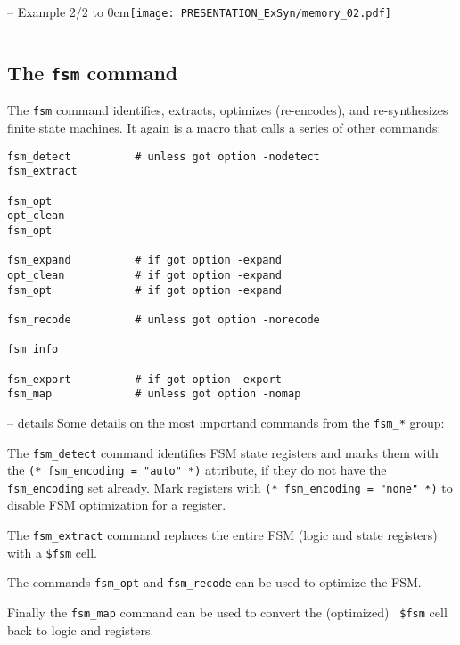 \begin{frame}[t, fragile]{\subsecname{} -- Example 2/2}
\vbox to 0cm{\hfill\texttt{[image: PRESENTATION\_ExSyn/memory\_02.pdf]}\vss}
\vskip-1cm
\begin{columns}
\column[t]{5cm}

\column[t]{5cm}

\end{columns}
\end{frame}


\subsection{The {\tt fsm} command}

\begin{frame}[fragile]{\subsecname{}}
The {\tt fsm} command identifies, extracts, optimizes (re-encodes), and
re-synthesizes finite state machines. It again is a macro that calls
a series of other commands:

\begin{lstlisting}[xleftmargin=0.5cm, basicstyle=\ttfamily\fontsize{8pt}{10pt}\selectfont, language=ys]
fsm_detect          # unless got option -nodetect
fsm_extract

fsm_opt
opt_clean
fsm_opt

fsm_expand          # if got option -expand
opt_clean           # if got option -expand
fsm_opt             # if got option -expand

fsm_recode          # unless got option -norecode

fsm_info

fsm_export          # if got option -export
fsm_map             # unless got option -nomap
\end{lstlisting}
\end{frame}

\begin{frame}{\subsecname{} -- details}
Some details on the most importand commands from the {\tt fsm\_*} group:

\bigskip
The {\tt fsm\_detect} command identifies FSM state registers and marks them
with the {\tt (* fsm\_encoding = "auto" *)} attribute, if they do not have the
{\tt fsm\_encoding} set already. Mark registers with {\tt (* fsm\_encoding =
"none" *)} to disable FSM optimization for a register.

\bigskip
The {\tt fsm\_extract} command replaces the entire FSM (logic and state
registers) with a {\tt \$fsm} cell.

\bigskip
The commands {\tt fsm\_opt} and {\tt fsm\_recode} can be used to optimize the
FSM.

\bigskip
Finally the {\tt fsm\_map} command can be used to convert the (optimized) {\tt
\$fsm} cell back to logic and registers.
\end{frame}

